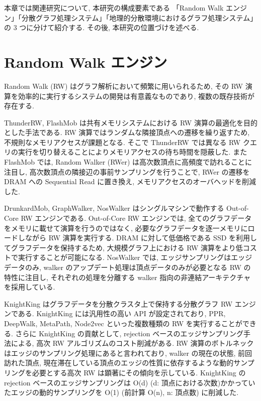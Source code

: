本章では関連研究について, 本研究の構成要素である 「Random Walk エンジン」「分散グラフ処理システム」「地理的分散環境におけるグラフ処理システム」の 3 つに分けて紹介する. その後, 本研究の位置づけを述べる. 

\section{Random Walk エンジン}\label{sec:Random Walk エンジン}

Random Walk (RW) はグラフ解析において頻繁に用いられるため, その RW 演算を効率的に実行するシステムの開発は有意義なものであり, 複数の既存技術が存在する. 

ThunderRW\cite{10.14778/3476249.3476257}, FlashMob\cite{10.1145/3477132.3483575} は共有メモリシステムにおける RW 演算の最適化を目的とした手法である. RW 演算ではランダムな隣接頂点への遷移を繰り返すため, 不規則なメモリアクセスが課題となる. そこで ThunderRW では異なる RW クエリの実行を切り替えることによりメモリアクセスの待ち時間を隠蔽した. また FlashMob では, Random Walker (RWer) は高次数頂点に高頻度で訪れることに注目し, 高次数頂点の隣接辺の事前サンプリングを行うことで, RWer の遷移を DRAM への Sequential Read に置き換え, メモリアクセスのオーバヘッドを削減した. 

DrunkardMob\cite{10.1145/2507157.2507173}, GraphWalker\cite{254449}, NosWalker\cite{10.1145/3582016.3582025} はシングルマシンで動作する Out-of-Core RW エンジンである. Out-of-Core RW エンジンでは, 全てのグラフデータをメモリに載せて演算を行うのではなく, 必要なグラフデータを逐一メモリにロードしながら RW 演算を実行する. DRAM に対して低価格である SSD を利用してグラフデータを保持するため, 大規模グラフ上における RW 演算をより低コストで実行することが可能になる. NosWalker では, エッジサンプリングはエッジデータのみ, walker のアップデート処理は頂点データのみが必要となる RW の特性に注目し, それぞれの処理を分離する walker 指向の非連結アーキテクチャを採用している. 

KnightKing\cite{10.1145/3341301.3359634} はグラフデータを分散クラスタ上で保持する分散グラフ RW エンジンである. KnightKing には汎用性の高い API が設定されており, PPR, DeepWalk, MetaPath, Node2vec といった複数種類の RW を実行することができる. さらに KnightKing の貢献として, rejection ベースのエッジサンプリング手法による, 高次 RW アルゴリズムのコスト削減がある. RW 演算のボトルネックはエッジのサンプリング処理にあると言われており, walker の現在の状態, 前回訪れた頂点, 現在滞在している頂点のエッジの性質に依存するような動的サンプリングを必要とする高次 RW は顕著にその傾向を示している. KnightKing の rejection ベースのエッジサンプリングは O(d) (d: 頂点における次数)かかっていたエッジの動的サンプリングを O(1) (前計算 O(n), n: 頂点数) に削減した.

